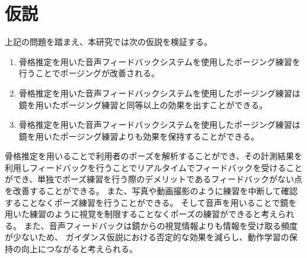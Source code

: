 \section{仮説}
上記の問題を踏まえ、本研究では次の仮説を検証する。
\begin{enumerate}
  \item 骨格推定を用いた音声フィードバックシステムを使用したポージング練習を行うことでポージングが改善される。
  \item 骨格推定を用いた音声フィードバックシステムを使用したポージング練習は鏡を用いたポージング練習と同等以上の効果を出すことができる。
  \item 骨格推定を用いた音声フィードバックシステムを使用したポージング練習は鏡を用いたポージング練習よりも効果を保持することができる。
\end{enumerate}
骨格推定を用いることで利用者のポーズを解析することができ、その計測結果を利用しフィードバックを行うことでリアルタイムでフィードバックを受けることができ、単独でポーズ練習を行う際のデメリットであるフィードバックがない点を改善することができる。
また、写真や動画撮影のように練習を中断して確認することなくポーズ練習を行うことができる。
そして音声を用いることで鏡を用いた練習のように視覚を制限することなくポーズの練習ができると考えられる。
また、音声フィードバックは鏡からの視覚情報よりも情報を受け取る頻度が少ないため、
ガイダンス仮説における否定的な効果を減らし、動作学習の保持の向上につながると考えられる。
